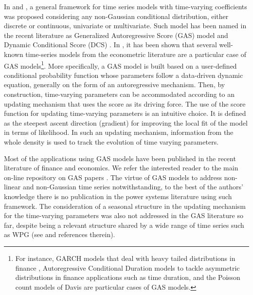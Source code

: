 \documentclass[a4paper]{IEEEtran}
\begin{document}
In \cite{creal2013generalized} and \cite{harvey2013dynamic}, a general framework for time series models with time-varying coefficients was proposed considering any non-Gaussian conditional distribution, either discrete or continuous, univariate or multivariate. Such model has been named in the recent literature as Generalized Autoregressive Score (GAS) model \cite{creal2013generalized} and Dynamic Conditional Score (DCS) \cite{harvey2013dynamic}. In \cite{creal2013generalized}, it has been shown that several well-known time-series models from the econometric literature are a particular case of GAS models\footnote{For instance, GARCH models that deal with heavy tailed distributions in finance \cite{engle1986modelling}, Autoregressive Conditional Duration models \cite{engle1998autoregressive} to tackle asymmetric distributions in finance applications such as time duration, and the Poisson count models of Davis \cite{davis2003observation} are particular cases of GAS models.}. More specifically, a GAS model is built based on a user-defined conditional probability function whose parameters follow a data-driven dynamic equation, generally on the form of an autoregressive mechanism. Then, by construction, time-varying parameters can be accommodated according to an updating mechanism that uses the score as its driving force. The use of the score function for updating time-varying parameters is an intuitive choice. It is defined as the steepest ascent direction (gradient) for improving the local fit of the model in terms of likelihood. In such an updating mechanism, information from the whole density is used to track the evolution of time varying parameters. 

Most of the applications using GAS models have been published in the recent literature of finance and economics. We refer the interested reader to the main on-line repository on GAS papers \cite{GASwebpage}. The virtue of GAS models to address non-linear and non-Gaussian time series notwithstanding, to the best of the authors' knowledge there is no publication in the power systems literature using such framework. The consideration of a seasonal structure in the updating mechanism for the time-varying parameters was also not addressed in the GAS literature so far, despite being a relevant structure shared by a wide range of time series such as WPG (see \cite{tseng2002fuzzy,lei2009review,FosteringWPP,souto2014high} and references therein). 
\end{document}
